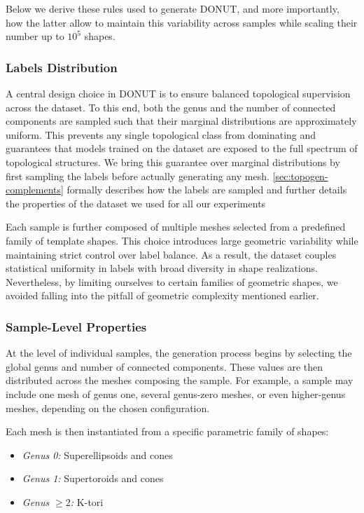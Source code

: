 Below we derive these rules used to generate DONUT, and more importantly, how the latter allow to maintain this variability across samples while scaling their number up to $10^5$ shapes.

\subsubsection{Labels Distribution}
\label{sssec:labels-distribution}

A central design choice in DONUT is to ensure balanced topological supervision across the dataset. To this end, both the genus and the number of connected components are sampled such that their marginal distributions are approximately uniform. This prevents any single topological class from dominating and guarantees that models trained on the dataset are exposed to the full spectrum of topological structures. We bring this guarantee over marginal distributions by first sampling the labels before actually generating any mesh. \ref{sec:topogen-complements} formally describes how the labels are sampled and further details the properties of the dataset we used for all our experiments

Each sample is further composed of multiple meshes selected from a predefined family of template shapes. This choice introduces large geometric variability while maintaining strict control over label balance. As a result, the dataset couples statistical uniformity in labels with broad diversity in shape realizations. Nevertheless, by limiting ourselves to certain families of geometric shapes, we avoided falling into the pitfall of geometric complexity mentioned earlier. 

\subsubsection{Sample-Level Properties}
\label{sssec:sample-level-properties}

At the level of individual samples, the generation process begins by selecting the global genus and number of connected components. These values are then distributed across the meshes composing the sample. For example, a sample may include one mesh of genus one, several genus-zero meshes, or even higher-genus meshes, depending on the chosen configuration.

Each mesh is then instantiated from a specific parametric family of shapes:
\begin{itemize}
  \item \textit{Genus 0:} Superellipsoids and cones
  \item \textit{Genus 1:} Supertoroids and cones
  \item \textit{Genus $\geq 2$:} K-tori
\end{itemize}

